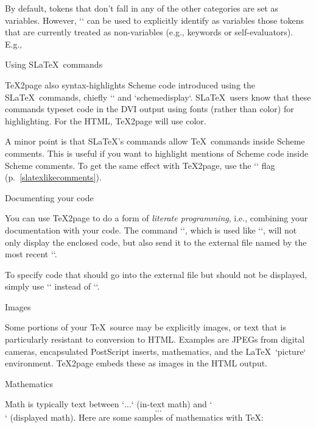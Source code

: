 \begintt
{}
\endtt

By default, tokens that don’t fall in any of the
other categories are set as variables.  However,
`\scmvariable` can be used to explicitly identify as
variables those tokens that are currently treated as
non-variables (e.g., keywords or self-evaluators).  E.g.,

\begintt
{}
\endtt

\beginsection Using S\LaTeX\ commands

%
\TeX2page also syntax-highlights Scheme code introduced
using the S\LaTeX\ commands, chiefly
`\scheme` and `{schemedisplay}`.  S\LaTeX\ users know
that these commands typeset code in the DVI output
using fonts (rather than color) for highlighting.
For the HTML, \TeX2page will use color.

A minor point is that S\LaTeX’s commands allow \TeX\
commands inside Scheme comments.  This is useful
if you want to highlight mentions of Scheme code inside
Scheme comments.  To get the same effect with \TeX2page,
use the `\TZPslatexcomments` flag (p.~\ref{slatexlikecomments}).

\beginsection Documenting your code

%
You can use \TeX2page to do a form of {\em literate
programming}, i.e., combining your documentation with
your code.  The command `\scmdribble`, which is used
like `\scm`, will not only display the enclosed code,
but also send it to the external file named by
the most recent `\verbwritefile`.

To specify code that should go into the external file but
should not be displayed, simply use
`\verbwrite` instead of `\scmdribble`.

 Images

%
Some portions of your \TeX\ source may be explicitly
images, or text that is particularly resistant to
conversion to HTML.  Examples are JPEGs from digital cameras, encapsulated
PostScript inserts, mathematics, and the \LaTeX\
`{picture}` environment.   \TeX2page embeds these as images in the HTML
output.

\beginsection Mathematics

%
Math is typically text between `$...$` (in-text
math) and `$$...$$` (displayed math).  Here are some
samples of mathematics with \TeX:

